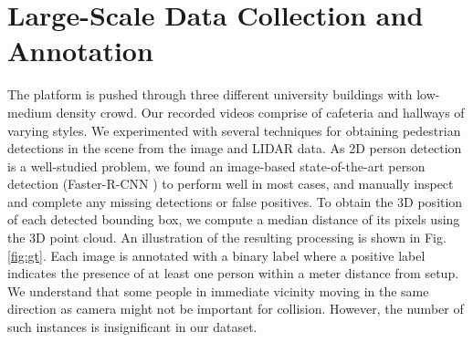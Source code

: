 



\section{Large-Scale Data Collection and Annotation}
The platform is pushed through three different university buildings with low-medium density crowd. Our recorded videos comprise of cafeteria and hallways of varying styles. 
We experimented with several techniques for obtaining pedestrian detections in the scene from the image and LIDAR data. As 2D person detection is a well-studied problem, we found an image-based state-of-the-art person detection (Faster-R-CNN \cite{fasterRCNN}) to perform well in most cases, and manually inspect and complete any missing detections or false positives. To obtain the 3D position of each detected bounding box, we compute a median distance of its pixels using the 3D point cloud. An illustration of the resulting processing is shown in Fig. \ref{fig:gt}. Each image is annotated with a binary label where a positive label indicates the presence of at least one person within a meter distance from setup. We understand that some people in immediate vicinity moving in the same direction as camera might not be important for collision. However, the number of such instances is insignificant in our dataset. \\


